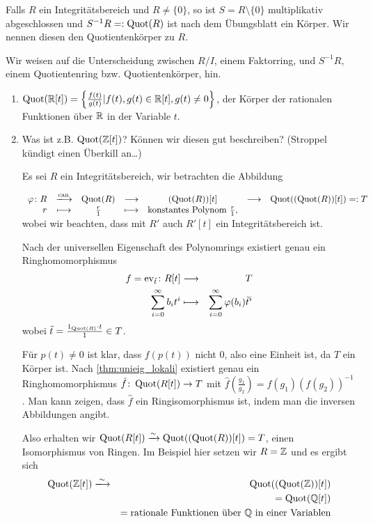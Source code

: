 \documentclass[12pt,a4paper]{scrartcl}
\begin{document}
\begin{defi}
	Falls $R$ ein Integritätsbereich und $R\neq\{0\}$, so ist $S = R\setminus\{0\}$ multiplikativ abgeschlossen und $S^{-1}R =: \operatorname{Quot}(R)$ ist nach dem Übungsblatt ein Körper. Wir nennen diesen den Quotientenkörper zu $R$.
\end{defi}
\begin{bem} Wir weisen auf die Unterscheidung zwischen $R/I$, einem Faktorring, und $S^{-1}R$, einem Quotientenring bzw. Quotientenkörper, hin.
\end{bem}
\begin{bsp}
	\leavevmode
	\begin{enumerate}
		\item $\operatorname{Quot}(\mathbb R[t]) = \left\{\frac{f(t)}{g(t)}| f(t), g(t)\in \mathbb R[t], g(t)\neq 0\right\}$, der Körper der rationalen Funktionen über $\mathbb R$ in der Variable $t$.
		
		\item Was ist z.B. $\operatorname{Quot}(\mathbb Z[t])$? Können wir diesen \glqq gut\grqq{} beschreiben? (Stroppel kündigt einen Überkill an\dots)
		
		Es sei $R$ ein Integritätsbereich, wir betrachten die Abbildung
		
		$\begin{array}{rcccccl}
			\phi\colon R & \xlongrightarrow{\can} & \Quot(R) &\longto& (\Quot(R))[t] &\longto& \Quot((\Quot(R))[t]) =: T\\
			r& \longmapsto & \frac r1 & \longmapsto & \text{konstantes Polynom } \frac r1,
		\end{array}$
		wobei wir beachten, dass mit $R'$ auch $R'[t]$ ein Integritätsbereich ist.
		
		Nach der universellen Eigenschaft des Polynomrings existiert genau ein Ringhomomorphismus
		\begin{eqnarray*}
			f = \operatorname{ev}_{\tilde{t}}\colon R[t] & \longrightarrow & T\\
			\sum_{i = 0}^{\infty} b_it^i & \longmapsto & \sum_{i = 0}^{\infty}\varphi(b_i)\tilde{t}^i
		\end{eqnarray*}
		wobei $\tilde{t} = \frac{1_{\operatorname{Quot}(R)}\cdot t}{1} \in T$.
		
		Für $p(t)\neq 0$ ist klar, dass $f(p(t))$ nicht $0$, also eine Einheit ist, da $T$ ein Körper ist. Nach \cref{thm:unieig_lokali} existiert genau ein Ringhomomorphismus $\hat{f}\colon \operatorname{Quot}(R[t])\to T$ mit $\hat{f}\left(\frac{g_1}{g_2}\right) = f(g_1)(f(g_2))^{-1}$. Man kann zeigen, dass $\hat{f}$ ein Ringisomorphismus ist, indem man die inversen Abbildungen angibt.
		
		Also erhalten wir $\operatorname{Quot}(R[t])\xrightarrow{\sim} \operatorname{Quot}((\operatorname{Quot}(R))[t]) = T$, einen Isomorphismus von Ringen. Im Beispiel hier setzen wir $R = \mathbb Z$ und es ergibt sich
		\begin{eqnarray*}
			\Quot(\IZ[t]) & \xlongrightarrow{\sim} & \Quot((\Quot(\IZ))[t])\\
			& &= \Quot(\IQ[t])\\
			&& = \text{rationale Funktionen über $\IQ$ in einer Variablen}
		\end{eqnarray*}
	\end{enumerate}
\end{bsp}
\end{document}
